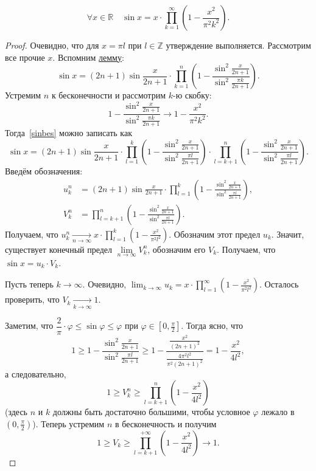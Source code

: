 \begin{theorem}
	\[
		\forall x \in \mathbb{R} \quad \sin x = x \cdot \prod_{k=1}^{\infty} \left(1 - \frac{x^2}{\pi^2 k^2} \right).
	\]
\end{theorem}
\begin{proof}
	Очевидно, что для \(x = \pi l\) при \(l \in \mathbb{Z}\) утверждение выполняется. Рассмотрим все прочие \(x\). Вспомним \hyperlink{sinlem}{лемму}:
	\begin{equation} \label{sinbes}
		\sin x = (2n + 1) \sin \frac{x}{2n + 1} \cdot \prod_{k=1}^{n} \left(1 - \frac{\sin^2 \frac{x}{2n + 1}}{\sin^2 \frac{\pi k}{2n + 1}} \right).
	\end{equation}
	Устремим \(n\) к бесконечности и рассмотрим \(k\)-ю скобку: \[
	1 - \frac{\sin^2 \frac{x}{2n + 1}}{\sin^2 \frac{\pi k}{2n + 1}} \to 1 - \frac{x^2}{\pi^2 k^2}.
	\]
	Тогда~\eqref{sinbes} можно записать как \[
	\sin x = (2n + 1) \sin \frac{x}{2n + 1} \cdot \prod_{l=1}^{k} \left(1 - \frac{\sin^2 \frac{x}{2n + 1}}{\sin^2 \frac{\pi l}{2n + 1}} \right) \cdot \prod_{l=k+1}^{n} \left(1 - \frac{\sin^2 \frac{x}{2n + 1}}{\sin^2 \frac{\pi l}{2n + 1}} \right).
	\]
	Введём обозначения:
	\begin{align*}
		u_k^n &= (2n + 1) \sin \frac{x}{2n + 1} \cdot \prod_{l=1}^{k} \left(1 - \frac{\sin^2 \frac{x}{2n + 1}}{\sin^2 \frac{\pi l}{2n + 1}} \right), \\
		V_k^n &= \prod_{l=k+1}^{n} \left(1 - \frac{\sin^2 \frac{x}{2n + 1}}{\sin^2 \frac{\pi l}{2n + 1}} \right).
	\end{align*}
	Получаем, что \(\displaystyle u_k^n \xrightarrow[n \to \infty]{} x \cdot \prod_{l=1}^{k} \left(1 - \frac{x^2}{\pi^2 l^2} \right)\). Обозначим этот предел \(u_k\). Значит, существует конечный предел \(\lim\limits_{n \to \infty} V_k^n\), обозначим его \(V_k\). Получаем, что \(\sin x = u_k \cdot V_k\).
	
	Пусть теперь \(k \to \infty\). Очевидно, \(\displaystyle \lim_{k \to \infty} u_k = x \cdot \prod_{l=1}^{\infty} \left(1 - \frac{x^2}{\pi^2 l^2} \right)\). Осталось проверить, что \(V_k \xrightarrow[k \to \infty]{} 1\).
	
	Заметим, что \(\dfrac{2}{\pi} \cdot \varphi \leqslant \sin \varphi \leqslant \varphi\) при \(\varphi \in \left[0, \frac{\pi}{2} \right]\). Тогда ясно, что \[
	1 \geqslant 1 - \frac{\sin^2 \frac{x}{2n + 1}}{\sin^2 \frac{\pi l}{2n + 1}} \geqslant 1 - \frac{\frac{x^2}{(2n + 1)^2}}{\frac{4 \pi^2 l^2}{\pi^2 (2n + 1)^2}} = 1 - \frac{x^2}{4 l^2},
	\]
	а следовательно, \[
	1 \geqslant V_k^n \geqslant \prod_{l=k+1}^{n} \left(1 - \frac{x^2}{4 l^2} \right)
	\]
	(здесь \(n\) и \(k\) должны быть достаточно большими, чтобы условное \(\varphi\) лежало в \(\left(0, \frac{\pi}{2} \right)\)).
	Теперь устремим \(n\) в бесконечность и получим \[
	1 \geqslant V_k \geqslant \prod_{l=k+1}^{+\infty} \left(1 - \frac{x^2}{4 l^2} \right) \to 1.
	\]
\end{proof}


